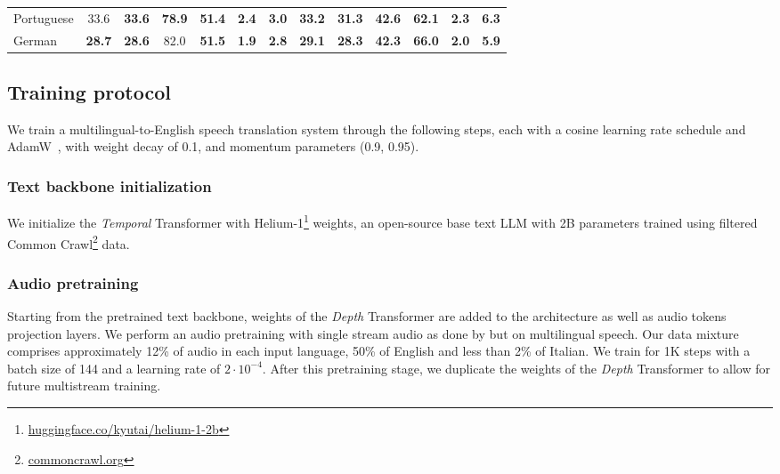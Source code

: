 \begin{table}[t]
\begin{center}
\begin{sc}
{\begin{tabular}{lcccccccccccc}
    Portuguese
        & 33.6 & \textbf{33.6} & \textbf{78.9} & \textbf{51.4} & \textbf{2.4} & \textbf{3.0}
        & \textbf{33.2} & \textbf{31.3} & \textbf{42.6} & \textbf{62.1} & \textbf{2.3} & \textbf{6.3} \\
    German
        & \textbf{28.7} & \textbf{28.6} & 82.0 & \textbf{51.5} & \textbf{1.9} & \textbf{2.8}
        & \textbf{29.1} & \textbf{28.3} & \textbf{42.3} & \textbf{66.0} & \textbf{2.0} & \textbf{5.9} \\
    \bottomrule
    \end{tabular}}
    \end{sc}
    \end{center}
\end{table}

\subsection{Training protocol}
\label{sec:training_protocol}
We train a multilingual-to-English speech translation system through the following steps, each with a cosine learning rate schedule and AdamW~\citep{adamw}, with weight decay of 0.1, and momentum parameters (0.9, 0.95).

\subsubsection{Text backbone initialization}
\label{sec:text_pretraining}
We initialize the \emph{Temporal} Transformer with Helium-1\footnote{\href{https://huggingface.co/kyutai/helium-1-2b}{huggingface.co/kyutai/helium-1-2b}} \citep{helium} weights, an open-source base text LLM with 2B parameters trained using filtered Common Crawl\footnote{\href{https://commoncrawl.org}{commoncrawl.org}} data.

\subsubsection{Audio pretraining}
\label{sec:audio_pretraining}
Starting from the pretrained text backbone, weights of the \emph{Depth} Transformer are added to the architecture as well as audio tokens projection layers. We perform an audio pretraining with single stream audio as done by \citet{hibiki} but on multilingual speech. Our data mixture comprises approximately 12\% of audio in each input language, 50\% of English and less than 2\% of Italian. We train for 1K steps with a batch size of 144 and a learning rate of $2\cdot10^{-4}$. After this pretraining stage, we duplicate the weights of the \emph{Depth} Transformer to allow for future multistream training.

